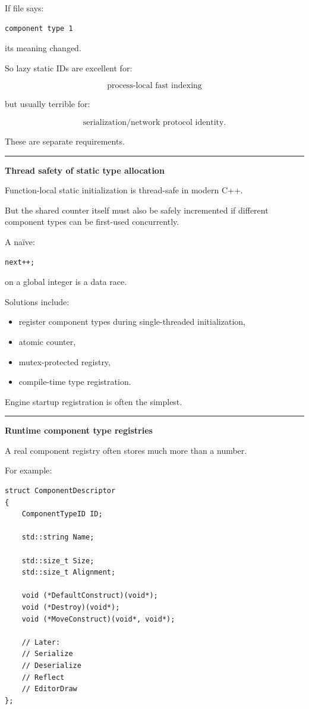 If file says:

\begin{verbatim}
component type 1
\end{verbatim}

its meaning changed.

So lazy static IDs are excellent for:

\[
\boxed{\text{process-local fast indexing}}
\]

but usually terrible for:

\[
\boxed{\text{serialization/network protocol identity}}.
\]

These are separate requirements.

\begin{center}\rule{0.5\linewidth}{0.5pt}\end{center}

\textbf{Thread safety of static type allocation}

Function-local static initialization is thread-safe in modern C++.

But the shared counter itself must also be safely incremented if different component types can be first-used concurrently.

A naïve:

\begin{verbatim}
next++;
\end{verbatim}

on a global integer is a data race.

Solutions include:

\begin{itemize}
\tightlist
\item
  register component types during single-threaded initialization,
\item
  atomic counter,
\item
  mutex-protected registry,
\item
  compile-time type registration.
\end{itemize}

Engine startup registration is often the simplest.

\begin{center}\rule{0.5\linewidth}{0.5pt}\end{center}

\textbf{Runtime component type registries}

A real component registry often stores much more than a number.

For example:

\begin{verbatim}
struct ComponentDescriptor
{
    ComponentTypeID ID;

    std::string Name;

    std::size_t Size;
    std::size_t Alignment;

    void (*DefaultConstruct)(void*);
    void (*Destroy)(void*);
    void (*MoveConstruct)(void*, void*);

    // Later:
    // Serialize
    // Deserialize
    // Reflect
    // EditorDraw
};
\end{verbatim}

